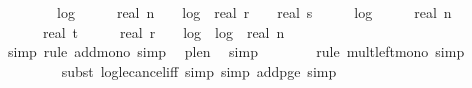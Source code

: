 \begin{isabellebody}
\ \ \ \ \ \ {}\ {\isacharasterisk}{\kern0pt}\ log\ {}\ {\isacharparenleft}{\kern0pt}{}\ {\isacharasterisk}{\kern0pt}\ {\isacharparenleft}{\kern0pt}{}{}\ {\isacharplus}{\kern0pt}\ real\ n{\isacharparenright}{\kern0pt}{\isacharparenright}{\kern0pt}\ {\isacharplus}{\kern0pt}\ {}\ {\isacharasterisk}{\kern0pt}\ log\ {}\ {\isacharparenleft}{\kern0pt}real\ r\ {\isacharplus}{\kern0pt}\ {}{\isacharparenright}{\kern0pt}\ {\isacharplus}{\kern0pt}\ real\ s\ {\isacharasterisk}{\kern0pt}\ {\isacharparenleft}{\kern0pt}{}\ {\isacharplus}{\kern0pt}\ {}\ {\isacharasterisk}{\kern0pt}\ log\ {}\ {\isacharparenleft}{\kern0pt}{}\ {\isacharasterisk}{\kern0pt}\ {\isacharparenleft}{\kern0pt}{}{}\ {\isacharplus}{\kern0pt}\ real\ n{\isacharparenright}{\kern0pt}{\isacharparenright}{\kern0pt}\ {\isacharplus}{\kern0pt}\ \isanewline
\ \ \ \ \ \ real\ t\ {\isacharasterisk}{\kern0pt}\ {\isacharparenleft}{\kern0pt}{}{}\ {\isacharplus}{\kern0pt}\ {\isacharparenleft}{\kern0pt}{}\ {\isacharasterisk}{\kern0pt}\ real\ r\ {\isacharplus}{\kern0pt}\ {}\ {\isacharasterisk}{\kern0pt}\ log\ {}\ {\isacharparenleft}{\kern0pt}log\ {}\ {\isacharparenleft}{\kern0pt}real\ n\ {\isacharplus}{\kern0pt}\ {}{\isacharparenright}{\kern0pt}{\isacharparenright}{\kern0pt}{\isacharparenright}{\kern0pt}{\isacharparenright}{\kern0pt}{\isacharparenright}{\kern0pt}{\isacharparenright}{\kern0pt}{\isachardoublequoteclose}\isanewline
\ \ \ \ \ \ \isamarkupfalse%
\ {\isacharparenleft}{\kern0pt}simp{\isacharcomma}{\kern0pt}\ rule\ add{\isacharunderscore}{\kern0pt}mono{\isacharcomma}{\kern0pt}\ simp{\isacharparenright}{\kern0pt}\ \isamarkupfalse%
\ p{\isacharunderscore}{\kern0pt}le{\isacharunderscore}{\kern0pt}n\ \isamarkupfalse%
\ simp\isanewline
\ \ \ \ \ \ \isamarkupfalse%
\ {\isacharparenleft}{\kern0pt}rule\ mult{\isacharunderscore}{\kern0pt}left{\isacharunderscore}{\kern0pt}mono{\isacharcomma}{\kern0pt}\ simp{\isacharparenright}{\kern0pt}\isanewline
\ \ \ \ \ \ \ \isamarkupfalse%
\ {\isacharparenleft}{\kern0pt}subst\ log{\isacharunderscore}{\kern0pt}le{\isacharunderscore}{\kern0pt}cancel{\isacharunderscore}{\kern0pt}iff{\isacharcomma}{\kern0pt}\ simp{\isacharcomma}{\kern0pt}\ simp\ add{\isacharcolon}{\kern0pt}p{\isacharunderscore}{\kern0pt}ge{\isacharunderscore}{\kern0pt}{}{\isacharcomma}{\kern0pt}\ simp{\isacharparenright}{\kern0pt}\isanewline

\end{isabellebody}
